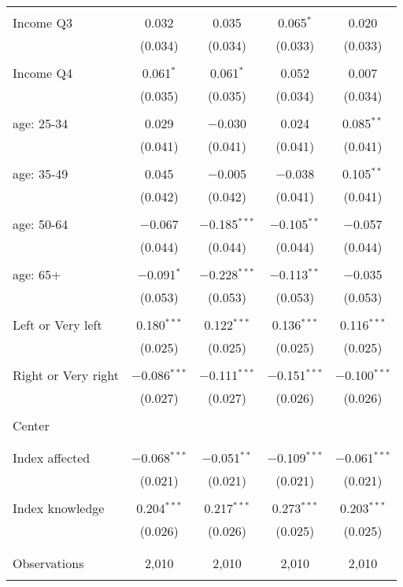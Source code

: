 \begin{tabular}{@{\extracolsep{5pt}}lcccc}
  & & & & \\ 
 Income Q3 & 0.032 & 0.035 & 0.065$^{*}$ & 0.020 \\ 
  & (0.034) & (0.034) & (0.033) & (0.033) \\ 
  & & & & \\ 
 Income Q4 & 0.061$^{*}$ & 0.061$^{*}$ & 0.052 & 0.007 \\ 
  & (0.035) & (0.035) & (0.034) & (0.034) \\ 
  & & & & \\ 
 age: 25-34 & 0.029 & $-$0.030 & 0.024 & 0.085$^{**}$ \\ 
  & (0.041) & (0.041) & (0.041) & (0.041) \\ 
  & & & & \\ 
 age: 35-49 & 0.045 & $-$0.005 & $-$0.038 & 0.105$^{**}$ \\ 
  & (0.042) & (0.042) & (0.041) & (0.041) \\ 
  & & & & \\ 
 age: 50-64 & $-$0.067 & $-$0.185$^{***}$ & $-$0.105$^{**}$ & $-$0.057 \\ 
  & (0.044) & (0.044) & (0.044) & (0.044) \\ 
  & & & & \\ 
 age: 65+ & $-$0.091$^{*}$ & $-$0.228$^{***}$ & $-$0.113$^{**}$ & $-$0.035 \\ 
  & (0.053) & (0.053) & (0.053) & (0.053) \\ 
  & & & & \\ 
 Left or Very left & 0.180$^{***}$ & 0.122$^{***}$ & 0.136$^{***}$ & 0.116$^{***}$ \\ 
  & (0.025) & (0.025) & (0.025) & (0.025) \\ 
  & & & & \\ 
 Right or Very right & $-$0.086$^{***}$ & $-$0.111$^{***}$ & $-$0.151$^{***}$ & $-$0.100$^{***}$ \\ 
  & (0.027) & (0.027) & (0.026) & (0.026) \\ 
  & & & & \\ 
 Center &  &  &  &  \\ 
  &  &  &  &  \\ 
  & & & & \\ 
 Index affected & $-$0.068$^{***}$ & $-$0.051$^{**}$ & $-$0.109$^{***}$ & $-$0.061$^{***}$ \\ 
  & (0.021) & (0.021) & (0.021) & (0.021) \\ 
  & & & & \\ 
 Index knowledge & 0.204$^{***}$ & 0.217$^{***}$ & 0.273$^{***}$ & 0.203$^{***}$ \\ 
  & (0.026) & (0.026) & (0.025) & (0.025) \\ 
  & & & & \\ 
\hline \\[-1.8ex] 

Observations & 2,010 & 2,010 & 2,010 & 2,010 \\ 
\hline 
\hline \\[-1.8ex] 
\end{tabular} 